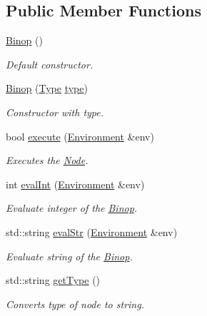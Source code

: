 \subsection*{Public Member Functions}
\begin{DoxyCompactItemize}
\item 
\hypertarget{classBinop_a18bd9729a042a045df7fe11ffe068707}{}\hyperlink{classBinop_a18bd9729a042a045df7fe11ffe068707}{Binop} ()\label{classBinop_a18bd9729a042a045df7fe11ffe068707}

\begin{DoxyCompactList}\small\item\em Default constructor. \end{DoxyCompactList}\item 
\hyperlink{classBinop_a3d538d66e8aa1ac46feb5e984fbfb8c9}{Binop} (\hyperlink{classBinop_a833e85c431d85ca69758bfebec9193dc}{Type} \hyperlink{classBinop_a6ba1f508e1122caea1ef9350fee74396}{type})
\begin{DoxyCompactList}\small\item\em Constructor with type. \end{DoxyCompactList}\item 
bool \hyperlink{classBinop_ac3cff65931eaf4d542fc50c1dc696f55}{execute} (\hyperlink{classEnvironment}{Environment} \&env)
\begin{DoxyCompactList}\small\item\em Executes the \hyperlink{classNode}{Node}. \end{DoxyCompactList}\item 
int \hyperlink{classBinop_a5f011a9a0259af43447271dfc8668a2a}{eval\+Int} (\hyperlink{classEnvironment}{Environment} \&env)
\begin{DoxyCompactList}\small\item\em Evaluate integer of the \hyperlink{classBinop}{Binop}. \end{DoxyCompactList}\item 
std\+::string \hyperlink{classBinop_a9b31b3aa7963440e499143f8fb837bf4}{eval\+Str} (\hyperlink{classEnvironment}{Environment} \&env)
\begin{DoxyCompactList}\small\item\em Evaluate string of the \hyperlink{classBinop}{Binop}. \end{DoxyCompactList}\item 
std\+::string \hyperlink{classBinop_a25a4913ef0d2ec9787df24c391734094}{get\+Type} ()
\begin{DoxyCompactList}\small\item\em Converts type of node to string. \end{DoxyCompactList}\end{DoxyCompactItemize}
